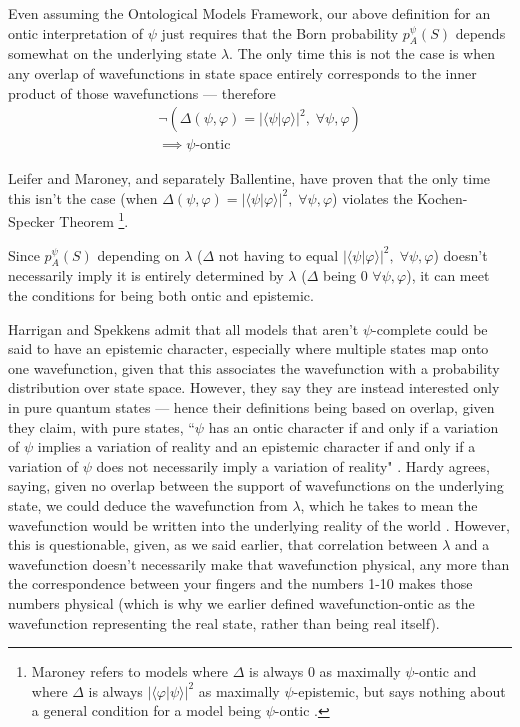 \documentclass[superscriptaddress, floatfix,nofootinbib,12pt]{revtex4-2}
\newcommand{\braket}[2]{\langle #1|#2 \rangle}
\begin{document}
Even assuming the Ontological Models Framework, our above definition for an ontic interpretation of $\psi$ just requires that the Born probability $p^\psi_A(S)$ depends somewhat on the underlying state $\lambda$. The only time this is not the case is when any overlap of wavefunctions in state space entirely corresponds to the inner product of those wavefunctions --- therefore
\begin{equation}
\begin{split}
    \neg(\Delta(\psi,\varphi)=\vert\braket{\psi}{\varphi}\vert^2,\;\forall\psi,\varphi)\\
    \implies\psi\text{-ontic}
    \end{split}
\end{equation}

Leifer and Maroney, and separately Ballentine, have proven that the only time this isn't the case (when $\Delta(\psi,\varphi)=\vert\braket{\psi}{\varphi}\vert^2,\;\forall\psi,\varphi$) violates the Kochen-Specker Theorem \cite{Leifer2013MaxEpist,Ballentine2014Ontological} \footnote{Maroney refers to models where $\Delta$ is always 0 as maximally $\psi$-ontic and where $\Delta$ is always $\vert\braket{\varphi}{\psi}\vert^2$ as maximally $\psi$-epistemic, but says nothing about a general condition for a model being $\psi$-ontic \cite{Maroney2012Statistical}.}.

Since $p^\psi_A(S)$ depending on $\lambda$ ($\Delta$ not having to equal $\vert\braket{\psi}{\varphi}\vert^2,\;\forall\psi,\varphi$) doesn't necessarily imply it is entirely determined by $\lambda$ ($\Delta$ being 0 $\forall\psi,\varphi$), it can meet the conditions for being both ontic and epistemic.

Harrigan and Spekkens admit that all models that aren't $\psi$-complete could be said to have an epistemic character, especially where multiple states map onto one wavefunction, given that this associates the wavefunction with a probability distribution over state space. However, they say they are instead interested only in pure quantum states --- hence their definitions being based on overlap, given they claim, with pure states, ``$\psi$ has an ontic character if and only if a variation of $\psi$ implies a variation of reality and an epistemic character if and only if a variation of $\psi$ does not necessarily imply a variation of reality" \cite{Harrigan2010Nonlocality}. Hardy agrees, saying, given no overlap between the support of wavefunctions on the underlying state, we could deduce the wavefunction from $\lambda$, which he takes to mean the wavefunction would be written into the underlying reality of the world \cite{Hardy2013QStatesReal}. However, this is questionable, given, as we said earlier, that correlation between $\lambda$ and a wavefunction doesn't necessarily make that wavefunction physical, any more than the correspondence between your fingers and the numbers 1-10 makes those numbers physical \cite{Schlosshauer2012Implications} (which is why we earlier defined wavefunction-ontic as the wavefunction representing the real state, rather than being real itself).
\end{document}
